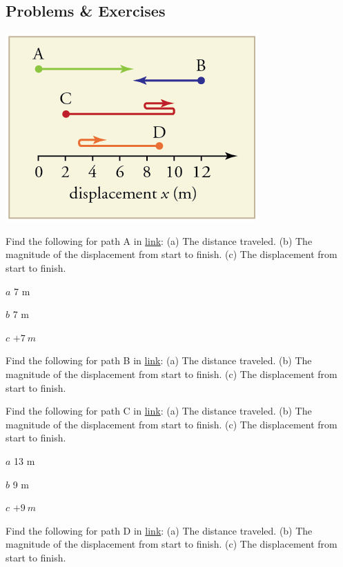 \documentclass[
]{book}
\newenvironment{problems-exercises}{}{}
\begin{document}
\hypertarget{fs-id3417389}{}
\begin{problems-exercises}

\hypertarget{problems-exercises}{%
\subsection{Problems \& Exercises}\label{problems-exercises}}

\includegraphics{images/Figure_02_01Sol_01.jpg}

\hypertarget{fs-id1126076}{}
\leavevmode\hypertarget{fs-id3312138}{}%
Find the following for path A in
\protect\hyperlink{import-auto-id2076702}{link}: (a) The distance
traveled. (b) The magnitude of the displacement from start to finish.
(c) The displacement from start to finish.

\leavevmode\hypertarget{fs-id1551519}{}%
\(a\) 7 m

\(b\) 7 m

\(c\) \({+ 7\ m}{}\)

\hypertarget{fs-id2823990}{}
\leavevmode\hypertarget{fs-id2804044}{}%
Find the following for path B in
\protect\hyperlink{import-auto-id2076702}{link}: (a) The distance
traveled. (b) The magnitude of the displacement from start to finish.
(c) The displacement from start to finish.

\hypertarget{fs-id4292134}{}
\leavevmode\hypertarget{fs-id2811336}{}%
Find the following for path C in
\protect\hyperlink{import-auto-id2076702}{link}: (a) The distance
traveled. (b) The magnitude of the displacement from start to finish.
(c) The displacement from start to finish.

\leavevmode\hypertarget{fs-id2791412}{}%
\(a\) 13 m

\(b\) 9 m

\(c\) \({+ 9\ m}{}\)

\hypertarget{fs-id3242594}{}
\leavevmode\hypertarget{fs-id1470371}{}%
Find the following for path D in
\protect\hyperlink{import-auto-id2076702}{link}: (a) The distance
traveled. (b) The magnitude of the displacement from start to finish.
(c) The displacement from start to finish.

\end{problems-exercises}
\end{document}
